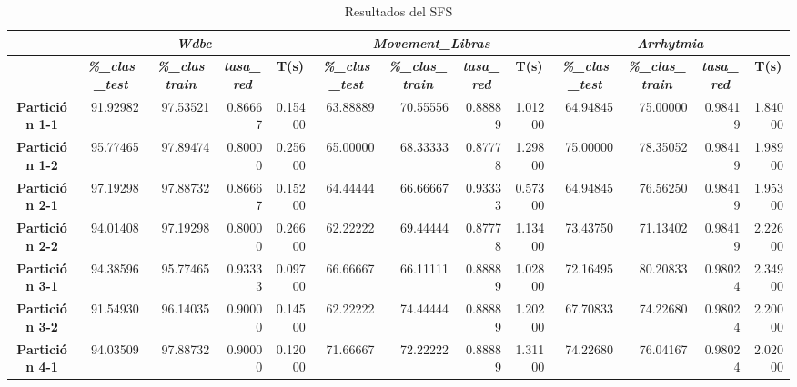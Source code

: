 \documentclass[a4paper,11pt]{article}
\begin{document}
   \begin{table}[H]	
    \caption*{Resultados del SFS}
    \begin{adjustbox}{width=1.1\textwidth}
   \begin{tabular}{|c|r|r|r|r|r|r|r|r|r|r|r|r|}
    \hline
    \multicolumn{1}{|l|}{} & \multicolumn{ 4}{c|}{\textbf{\textit{Wdbc}}} & \multicolumn{ 4}{c|}{\textbf{\textit{Movement\_Libras}}} & \multicolumn{ 4}{c|}{\textbf{\textit{Arrhytmia}}} \\ \hline
    \multicolumn{1}{|l|}{} & \multicolumn{1}{c|}{\textbf{\textit{\%\_clas\_test}}} & \multicolumn{1}{c|}{\textbf{\textit{\%\_clas train}}} & \multicolumn{1}{c|}{\textbf{\textit{tasa\_red}}} & \multicolumn{1}{c|}{\textbf{T(s)}} & \multicolumn{1}{c|}{\textbf{\textit{\%\_clas\_test}}} & \multicolumn{1}{c|}{\textbf{\textit{\%\_clas\_train}}} & \multicolumn{1}{c|}{\textbf{\textit{tasa\_red}}} & \multicolumn{1}{c|}{\textbf{T(s)}} & \multicolumn{1}{c|}{\textbf{\textit{\%\_clas\_test}}} & \multicolumn{1}{c|}{\textbf{\textit{\%\_clas\_train}}} & \multicolumn{1}{c|}{\textbf{\textit{tasa\_red}}} & \multicolumn{1}{c|}{\textbf{T(s)}} \\ \hline
    \textbf{Partición 1-1} & 91.92982 & 97.53521 & 0.86667 & 0.15400 & 63.88889 & 70.55556 & 0.88889 & 1.01200 & 64.94845 & 75.00000 & 0.98419 & 1.84000 \\ \hline
    \textbf{Partición 1-2} & 95.77465 & 97.89474 & 0.80000 & 0.25600 & 65.00000 & 68.33333 & 0.87778 & 1.29800 & 75.00000 & 78.35052 & 0.98419 & 1.98900 \\ \hline
    \textbf{Partición 2-1} & 97.19298 & 97.88732 & 0.86667 & 0.15200 & 64.44444 & 66.66667 & 0.93333 & 0.57300 & 64.94845 & 76.56250 & 0.98419 & 1.95300 \\ \hline
    \textbf{Partición 2-2} & 94.01408 & 97.19298 & 0.80000 & 0.26600 & 62.22222 & 69.44444 & 0.87778 & 1.13400 & 73.43750 & 71.13402 & 0.98419 & 2.22600 \\ \hline
    \textbf{Partición 3-1} & 94.38596 & 95.77465 & 0.93333 & 0.09700 & 66.66667 & 66.11111 & 0.88889 & 1.02800 & 72.16495 & 80.20833 & 0.98024 & 2.34900 \\ \hline
    \textbf{Partición 3-2} & 91.54930 & 96.14035 & 0.90000 & 0.14500 & 62.22222 & 74.44444 & 0.88889 & 1.20200 & 67.70833 & 74.22680 & 0.98024 & 2.20000 \\ \hline
    \textbf{Partición 4-1} & 94.03509 & 97.88732 & 0.90000 & 0.12000 & 71.66667 & 72.22222 & 0.88889 & 1.31100 & 74.22680 & 76.04167 & 0.98024 & 2.02000 \\ \hline

\end{tabular}
\end{adjustbox}
\end{table}
\end{document}
